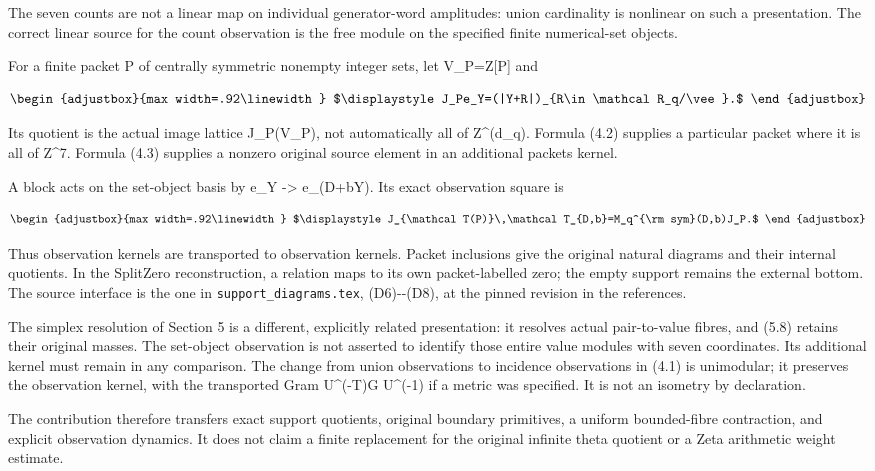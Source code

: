 The seven counts are not a linear map on individual generator-word amplitudes: union cardinality is nonlinear on such a presentation. The correct linear source for the count observation is the free module on the specified finite numerical-set objects.

For a finite packet P of centrally symmetric nonempty integer sets, let V\_P=Z{[}P{]} and

\[
\begin{adjustbox}{max width=.92\linewidth}
$\displaystyle J_Pe_Y=(|Y+R|)_{R\in\mathcal R_q/\vee}.$
\end{adjustbox}
\]

Its quotient is the actual image lattice J\_P(V\_P), not automatically all of Z\^{}(d\_q). Formula (4.2) supplies a particular packet where it is all of Z\^{}7. Formula (4.3) supplies a nonzero original source element in an additional packet\textquotesingle s kernel.

A block acts on the set-object basis by e\_Y -\textgreater{} e\_(D+bY). Its exact observation square is

\[
\begin{adjustbox}{max width=.92\linewidth}
$\displaystyle J_{\mathcal T(P)}\,\mathcal T_{D,b}=M_q^{\rm sym}(D,b)J_P.$
\end{adjustbox}
\]

Thus observation kernels are transported to observation kernels. Packet inclusions give the original natural diagrams and their internal quotients. In the SplitZero reconstruction, a relation maps to its own packet-labelled zero; the empty support remains the external bottom. The source interface is the one in \texttt{support\_diagrams.tex}, (D6)-\/-(D8), at the pinned revision in the references.

The simplex resolution of Section 5 is a different, explicitly related presentation: it resolves actual pair-to-value fibres, and (5.8) retains their original masses. The set-object observation is not asserted to identify those entire value modules with seven coordinates. Its additional kernel must remain in any comparison. The change from union observations to incidence observations in (4.1) is unimodular; it preserves the observation kernel, with the transported Gram U\^{}(-T)G U\^{}(-1) if a metric was specified. It is not an isometry by declaration.

The contribution therefore transfers exact support quotients, original boundary primitives, a uniform bounded-fibre contraction, and explicit observation dynamics. It does not claim a finite replacement for the original infinite theta quotient or a Zeta arithmetic weight estimate.

